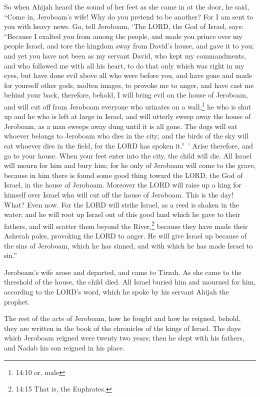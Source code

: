 \myverse{}So when Ahijah heard the sound of her feet as she came in at the
door, he said, “Come in, Jeroboam’s wife! Why do you pretend to be another? For I am sent to you with
heavy news.
\myverse{}Go, tell Jeroboam, ‘The LORD, the God of Israel, says: “Because I exalted you
from among the people, and made you prince over my people Israel,
\myverse{}and tore the kingdom away from David’s house, and gave it to you; and yet you
have not been as my servant David, who kept my commandments, and who followed me with all his heart, to
do that only which was right in my eyes,
\myverse{}but have done evil above all who were before you, and have gone and made for
yourself other gods, molten images, to provoke me to anger, and have cast me behind your back,
\myverse{}therefore, behold, I will bring evil on the house of Jeroboam, and will cut
off from Jeroboam everyone who urinates on a wall,\footnote{14:10 or, male} he who is shut up and he who is left at large in Israel, and will utterly sweep
away the house of Jeroboam, as a man sweeps away dung until it is all gone.
\myverse{}The dogs will eat whoever belongs to Jeroboam who dies in the city; and the
birds of the sky will eat whoever dies in the field, for the LORD has spoken it.” ’
\myverse{}Arise therefore, and go to your house. When your feet enter into the city,
the child will die.
\myverse{}All Israel will mourn for him and bury him; for he only of Jeroboam will
come to the grave, because in him there is found some good thing toward the LORD, the God of Israel, in
the house of Jeroboam.
\myverse{}Moreover the LORD will raise up a king for himself over Israel who will cut
off the house of Jeroboam. This is the day! What? Even now.
\myverse{}For the LORD will strike Israel, as a reed is shaken in the water; and he
will root up Israel out of this good land which he gave to their fathers, and will scatter them beyond
the River,\footnote{14:15 That is, the Euphrates.} because they have made their Asherah poles, provoking the LORD
to anger.
\myverse{}He will give Israel up because of the sins of Jeroboam, which he has sinned,
and with which he has made Israel to sin.”

\myverse{}Jeroboam’s wife arose and departed, and came to Tirzah. As she
came to the threshold of the house, the child died.
\myverse{}All Israel buried him and mourned for him, according to the LORD’s word,
which he spoke by his servant Ahijah the prophet.

\myverse{}The rest of the acts of Jeroboam, how he fought and how he reigned,
behold, they are written in the book of the chronicles of the kings of Israel.
\myverse{}The days which Jeroboam reigned were twenty two years; then he slept with
his fathers, and Nadab his son reigned in his place.

